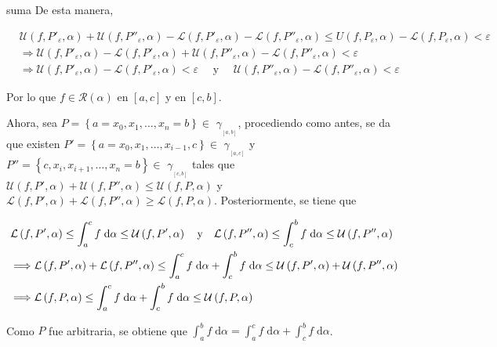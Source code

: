 \documentclass[fleqn, 12pt]{article}
\newenvironment{ejercicio}[1]{\begin{ejer}[breakable, pad at break = 5mm, leftrule = 0.7mm, rightrule = 0.7mm, right = 2mm, left = 2mm, enlarge bottom finally by = 3mm]{}{#1}}{\end{ejer}}
\newcommand{\rsi}[1]{\mathcal{R}(#1)}
\begin{document}
\begin{ejercicio}{suma}
		De esta manera, 
		
		\begin{align*}
			&\mathcal{U} \left( f, P'_\varepsilon, \alpha \right) + \mathcal{U} \left( f, P''_\varepsilon, \alpha \right) - \mathcal{L} \left( f, P'_\varepsilon, \alpha \right) - \mathcal{L} \left( f, P''_\varepsilon, \alpha \right) \leq U(f,P_\varepsilon,\alpha) -\mathcal{L} (f,P_\varepsilon,\alpha) < \varepsilon \\
			&\Longrightarrow \mathcal{U} \left( f, P'_\varepsilon, \alpha \right) - \mathcal{L} \left( f, P'_\varepsilon, \alpha \right) + \mathcal{U} \left( f, P''_\varepsilon, \alpha \right) - \mathcal{L} \left( f, P''_\varepsilon, \alpha \right) < \varepsilon \\
			&\Longrightarrow \mathcal{U} \left( f, P'_\varepsilon, \alpha \right) - \mathcal{L} \left( f, P'_\varepsilon, \alpha \right) < \varepsilon \quad \mbox{ y } \quad \mathcal{U} \left( f, P''_\varepsilon, \alpha \right) - \mathcal{L} \left( f, P''_\varepsilon, \alpha \right) < \varepsilon
		\end{align*}
		
		Por lo que $ f \in \rsi{\alpha} $ en $ [a,c] $ y en $ [c,b] $. \medskip

		Ahora, sea $ P = \left\lbrace a = x_0, x_1, \ldots, x_n = b \right\rbrace \in $ {\large $ \gamma_{_{[a,b]}} $}, procediendo como antes, se da que existen $ P' = \left\lbrace a = x_0, x_1, \ldots, x_{i-1}, c \right\rbrace \in $ {\large $ \gamma_{_{[a,c]}} $} y $ P'' = \left\lbrace c, x_i, x_{i+1}, \ldots, x_n = b \right\rbrace \in $ {\large $ \gamma_{_{[c,b]}} $} tales que $ \mathcal{U} \left( f, P', \alpha \right) + \mathcal{U} \left( f, P'', \alpha \right) \leq \mathcal{U} \left( f, P, \alpha \right) $ y $ \mathcal{L} \left( f, P', \alpha \right) + \mathcal{L} \left( f, P'', \alpha \right) \geq \mathcal{L} \left( f, P, \alpha \right) $. Posteriormente, se tiene que

		\begin{align*}
			&\mathcal{L} \left( f, P', \alpha \right) \leq \int_{a}^{c} f \; \mathrm{d} \alpha \leq \mathcal{U} \left( f, P', \alpha \right) \quad \hbox{y} \quad \mathcal{L} \left( f, P'', \alpha \right) \leq \int_{c}^{b} f \; \mathrm{d} \alpha \leq \mathcal{U} \left( f, P'', \alpha \right) \\
			&\Longrightarrow \mathcal{L} \left( f, P', \alpha \right) + \mathcal{L} \left( f, P'', \alpha \right) \leq \int_{a}^{c} f \; \mathrm{d} \alpha + \int_{c}^{b} f \; \mathrm{d} \alpha \leq \mathcal{U} \left( f, P', \alpha \right) + \mathcal{U} \left( f, P'', \alpha \right) \\
			&\Longrightarrow \mathcal{L} \left( f, P, \alpha \right) \leq \int_{a}^{c} f \; \mathrm{d} \alpha + \int_{c}^{b} f \; \mathrm{d} \alpha \leq \mathcal{U} \left( f, P, \alpha \right)
		\end{align*}

		Como $ P $ fue arbitraria, se obtiene que $ \displaystyle \int_{a}^{b} f \; \mathrm{d} \alpha = \int_{a}^{c} f \; \mathrm{d} \alpha + \int_{c}^{b} f \; \mathrm{d} \alpha $.
	\end{ejercicio}
	
\end{document}
